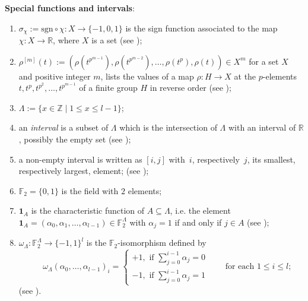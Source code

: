 \documentclass[12pt]{amsart}
\theoremstyle{theorem}
\theoremstyle{definition}
\theoremstyle{remark}
\begin{document}
\noindent\textbf{Special functions and intervals}:
\begin{enumerate}[label=$\bullet$, leftmargin=5mm] 
	\item  $\sigma^{}_{\chi}:=\mathrm{sgn}\circ \chi: X\rightarrow \{-1,0,1\}$ 
               is the sign function associated to the map 
               $\chi:X\rightarrow \mathbb{R}$, where $X$ is a set 
               (see \cite[Definition 2.1.1]{HL25});
	\item  $\rho^{[m]}( t ) := (\rho( t^{p^{m-1}} ), \rho( t^{p^{m-2}} ), 
               \ldots, \rho( t^p ), \rho( t ) )\in X^{m}$ for a set $X$ and 
               positive integer $m$, lists  the values of a map 
               $\rho:H\rightarrow X$ at the $p$-elements 
               $t, t^p, t^{p^2}, \ldots, t^{p^{m-1}}$ of a finite group $H$  in 
               reverse order (see \cite[Definition 2.1.2]{HL25});
	\item  $\Lambda:=\{x\in \mathbb{Z}\mid 1\leq x\leq l-1\}$;
	\item  an \emph{interval} is a subset of $\Lambda$ which is the intersection 
               of $\Lambda$ with an interval of $\mathbb{R}$, possibly the empty set 
               (see \cite[Subsection 2.2]{HL25});
	\item  a non-empty interval is written as $[i,j]$ with~$i$, respectively~$j$, its 
               smallest, respectively largest, element; 
               (see \cite[Subsection 2.2]{HL25});
	\item  $\mathbb{F}_{2}=\{0,1\}$ is the field with $2$ elements;
	\item  $\mathbf{1}_A$ is the characteristic function of $A \subseteq \Lambda$, 
               i.e. the element 
               $\mathbf{1}_A = (\alpha_0, \alpha_1, \ldots, \alpha_{l-1} )\in 
               \mathbb{F}_2^\Lambda$ with $\alpha_j = 1$ if and only if  $j \in A$ 
               (see \cite[Subsection 2.2]{HL25});
	\item  $\omega_{\Lambda}: \mathbb{F}_2^{\Lambda} \rightarrow \{ -1, 1 \}^l$ 
               is the $\mathbb{F}_{2}$-isomorphism defined by 
               $$
               \phantom{\bullet\quad}\omega_{\Lambda}(\alpha_0, \ldots , \alpha_{l-1})_i = 
               \begin{cases} 
               +1, \text{\ if\ } \sum_{j = 0}^{i-1} \alpha_j = 0\\
               -1, \text{\ if\ } \sum_{j = 0}^{i-1} \alpha_j = 1
               \end{cases}\quad\quad\text{for each\ } 1 \leq i \leq l;
               $$
                (see \cite[Subsection 2.2]{HL25}).
\end{enumerate}
\smallskip
\end{document}

